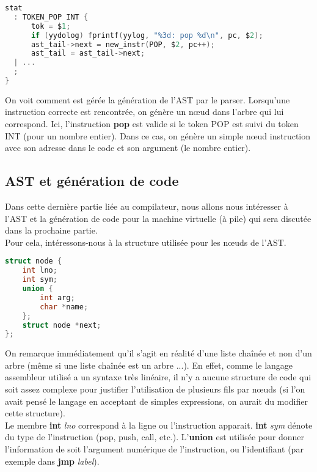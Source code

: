 \documentclass[14pt,a4paper]{article}
\begin{document}
		\begin{lstlisting}[frame=simple,language=C]
stat
  : TOKEN_POP INT {
      tok = $1;
      if (yydolog) fprintf(yylog, "%3d: pop %d\n", pc, $2);
      ast_tail->next = new_instr(POP, $2, pc++);
      ast_tail = ast_tail->next;
  | ...
  ;
}
	\end{lstlisting}
	
	On voit comment est gérée la génération de l'AST par le parser. Lorsqu'une instruction correcte est rencontrée, on génère un nœud dans l'arbre qui lui correspond. Ici, l'instruction \textbf{pop} est valide si le token POP est suivi du token INT (pour un nombre entier). Dans ce cas, on génère un simple nœud instruction avec son adresse dans le code et son argument (le nombre entier).
	
	\newpage
	
	\subsection{AST et génération de code}
	
	Dans cette dernière partie liée au compilateur, nous allons nous intéresser à l'AST et la génération de code pour la machine virtuelle (à pile) qui sera discutée dans la prochaine partie.\\
	
	Pour cela, intéressons-nous à la structure utilisée pour les nœuds de l'AST.
	
	\begin{lstlisting}[frame=simple,language=C]
struct node {
	int lno;
	int sym;
	union {
		int arg;
		char *name;
	};
	struct node *next;
};
	\end{lstlisting}
	
	On remarque immédiatement qu'il s'agit en réalité d'une liste chaînée et non d'un arbre (même si une liste chaînée est un arbre ...). En effet, comme le langage assembleur utilisé a un syntaxe très linéaire, il n'y a aucune structure de code qui soit assez complexe pour justifier l'utilisation de plusieurs fils par nœuds (si l'on avait pensé le langage en acceptant de simples expressions, on aurait du modifier cette structure).\\
	
	Le membre \textbf{int} \textit{lno} correspond à la ligne ou l'instruction apparait. \textbf{int} \textit{sym} dénote du type de l'instruction (pop, push, call, etc.). L'\textbf{union} est utilisée pour donner l'information de soit l'argument numérique de l'instruction, ou l'identifiant (par exemple dans \textbf{jmp} \textit{label}).\\
	
\end{document}
